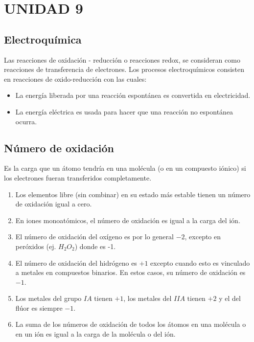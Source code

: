 \saltoPag{}
\section{UNIDAD 9}
    \subsection{Electroquímica}
        \sangria{} Las reacciones de oxidación - reducción o reacciones redox, se consideran como reacciones de transferencia de electrones.
        Los procesos electroquímicos consisten en reacciones de oxido-reducción con las cuales: \begin{itemize} \item La energía liberada por una reacción espontánea es convertida en electricidad. \item La energía eléctrica es usada para hacer que una reacción no espontánea ocurra. \end{itemize}
    \subsection{Número de oxidación}
    \sangria{} Es la carga que un átomo tendría en una molécula (o en un compuesto iónico) si los electrones fueran transferidos completamente.
    \begin{enumerate}
        \item Los elementos libre (sin combinar) en su estado más estable tienen un número de oxidación igual a cero.
        \item En iones monoatómicos, el número de oxidación es igual a la carga del ión.
        \item El número de oxidación del oxígeno es por lo general $-2$, excepto en peróxidos (ej. $H_2O_2$) donde es -1.
        \item El número de oxidación del hidrógeno es $+1$ excepto cuando esto es vinculado a metales en compuestos binarios. En estos casos, su número de oxidación es $-1$.
        \item Los metales del grupo $IA$ tienen $+1$, los metales del $IIA$ tienen $+2$ y el del flúor es siempre $-1$.
        \item La suma de los números de oxidación de todos los átomos en una molécula o en un ión es igual a la carga de la molécula o del ión.
    \end{enumerate}
